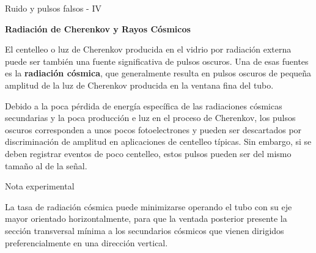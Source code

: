 \documentclass[a4paper,10pt]{beamer}
\begin{document}
\begin{frame}{Ruido y pulsos falsos - IV}
 
  {\Large{\textbf{\color{blue}Radiación de Cherenkov y Rayos Cósmicos}}}

 \begin{justify} 
 
 El centelleo o luz de Cherenkov producida en el vidrio por radiación externa puede 
 ser también una fuente significativa de pulsos oscuros. Una de esas fuentes es la 
 \textbf{radiación cósmica}, que generalmente resulta en pulsos oscuros de pequeña amplitud 
 de la luz de Cherenkov producida en la ventana fina del tubo.
 
 \vspace{.3cm}
 
 Debido a la poca pérdida de energía específica de las radiaciones cósmicas 
 secundarias y la poca producción e luz en el proceso de Cherenkov, los pulsos 
 oscuros corresponden a unos pocos fotoelectrones y pueden ser descartados 
 por discriminación de amplitud en aplicaciones de centelleo típicas. Sin embargo,
  si se deben registrar eventos de poco centelleo, estos pulsos pueden ser 
  del mismo tamaño al de la señal.
  
  \begin{exampleblock}{Nota experimental}
  \begin{justify}
  La tasa de radiación cósmica puede minimizarse operando el tubo con su eje 
  mayor orientado horizontalmente, para que la ventada posterior presente la
  sección transversal mínima a los secundarios cósmicos que vienen dirigidos 
  preferencialmente en una dirección vertical.
  \end{justify} 
  \end{exampleblock}
 
\end{justify} 
\end{frame}
\end{document}
